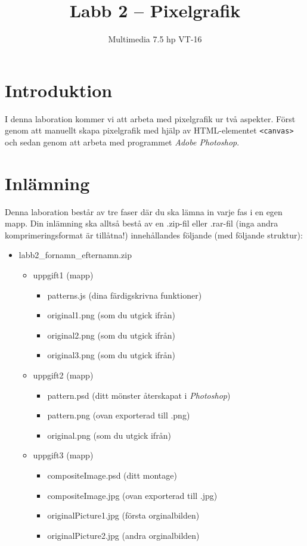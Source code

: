 \documentclass[12pt]{article}
\date{}
\title{ Labb 2 -- Pixelgrafik }
\author{ Multimedia 7.5 hp VT-16 }
\begin{document}
\maketitle
\vspace{-2em}



\section{Introduktion}
I denna laboration kommer vi att arbeta med pixelgrafik ur två aspekter. Först genom att manuellt skapa pixelgrafik med hjälp av HTML-elementet \texttt{<canvas>} och sedan genom att arbeta med programmet \emph{Adobe Photoshop}.

\section{Inlämning}
Denna laboration består av tre faser där du ska lämna in varje fas i en egen mapp. Din inlämning ska alltså bestå av en .zip-fil eller .rar-fil (inga andra komprimeringsformat är tillåtna!) innehållandes följande (med följande struktur):
  \begin{itemize}
    \item labb2\_fornamn\_efternamn.zip

      \begin{itemize}
        \item uppgift1 (mapp)
          \begin{itemize}
            \item patterns.js (dina färdigskrivna funktioner)
            \item original1.png (som du utgick ifrån)
            \item original2.png (som du utgick ifrån)
            \item original3.png (som du utgick ifrån)
          \end{itemize}

        \item uppgift2 (mapp)
          \begin{itemize}
            \item pattern.psd  (ditt mönster återskapat i \emph{Photoshop})
            \item pattern.png  (ovan exporterad till .png)
            \item original.png (som du utgick ifrån)
          \end{itemize}

        \item uppgift3 (mapp)
          \begin{itemize}
	    \item compositeImage.psd (ditt montage)
            \item compositeImage.jpg (ovan exporterad till .jpg)
            \item originalPicture1.jpg (första orginalbilden)
            \item originalPicture2.jpg (andra orginalbilden)
          \end{itemize}
    \end{itemize}
  \end{itemize}
\end{document}
